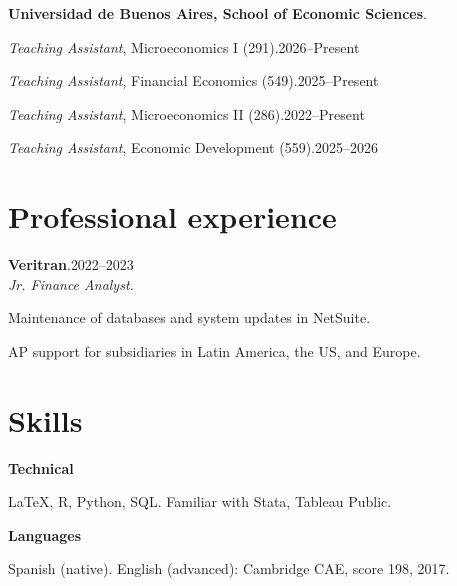 \documentclass[11pt]{article}
\newcommand{\entrydate}[1]{\hfill{\small{#1}}}
\begin{document}
\textbf{Universidad de Buenos Aires, School of Economic Sciences}.
\begin{cvitems}
  \item \textit{Teaching Assistant}, Microeconomics I (291).\entrydate{2026--Present}
  \item \textit{Teaching Assistant}, Financial Economics (549).\entrydate{2025--Present}
  \item \textit{Teaching Assistant}, Microeconomics II (286).\entrydate{2022--Present}
  \item \textit{Teaching Assistant}, Economic Development (559).\entrydate{2025--2026}
\end{cvitems}

\section{Professional experience}
\textbf{Veritran}.\entrydate{2022--2023}\\
\textit{Jr. Finance Analyst.}
\begin{cvitems}
  \item Maintenance of databases and system updates in NetSuite.
  \item AP support for subsidiaries in Latin America, the US, and Europe.
\end{cvitems}

\section{Skills}
\textbf{Technical}
\begin{cvitems}
  \item LaTeX, R, Python, SQL. Familiar with Stata, Tableau Public.
\end{cvitems}
\textbf{Languages}
\begin{cvitems}
\item Spanish (native). English (advanced): Cambridge CAE, score 198, 2017.
\end{cvitems}
\end{document}
